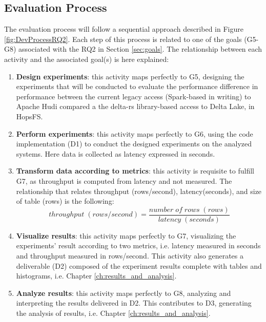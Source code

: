 \subsection{Evaluation Process}
\label{subsec:eval_process}
The evaluation process will follow a sequential approach described in Figure \ref{fig:DevProcessRQ2}. Each step of this process is related to one of the goals (G5-G8) associated with the RQ2 in Section \ref{sec:goals}.
The relationship between each activity and the associated goal(s) is here explained:
\begin{enumerate}
    \item \textbf{Design experiments}: this activity maps perfectly to G5, designing the experiments that will be conducted to evaluate the performance difference in performance between the current legacy access (Spark-based in writing) to Apache Hudi compared a the delta-rs library-based access to Delta Lake, in \gls{HopsFS}. 
    \item \textbf{Perform experiments}: this activity maps perfectly to G6, using the code implementation (D1) to conduct the designed experiments on the analyzed systems. Here data is collected as latency expressed in seconds.
    \item \textbf{Transform data according to metrics}: this activity is requisite to fulfill G7, as throughput is computed from latency and not measured. The relationship that relates throughput (rows/second), latency(seconds), and size of table (rows) is the following:
    \[ throughput \; (rows/second) = \frac{number \; of \; rows \; (rows)}{latency \;(seconds)}\]
    \item \textbf{Visualize results}: this activity maps perfectly to G7, visualizing the experiments' result according to two metrics, i.e. latency measured in seconds and throughput measured in rows/second. This activity also generates a deliverable (D2) composed of the experiment results complete with tables and histograms, i.e. Chapter \ref{ch:results_and_analysis}.
    \item \textbf{Analyze results}: this activity maps perfectly to G8, analyzing and interpreting the results delivered in D2. This contributes to D3, generating the analysis of results, i.e. Chapter \ref{ch:results_and_analysis}.
\end{enumerate}
